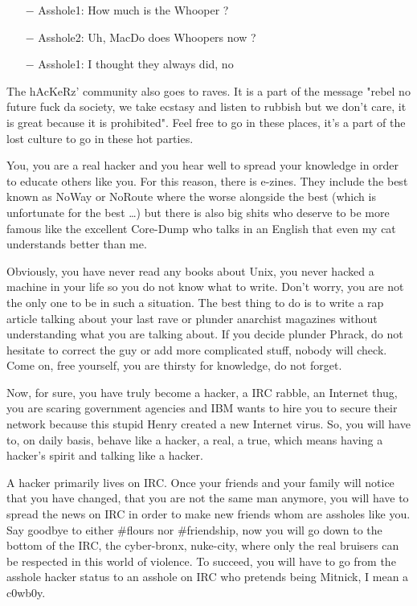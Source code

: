 \begin{itemize}
	\item[$-$] Asshole1: How much is the Whooper ?
	\item[$-$] Asshole2: Uh, MacDo does Whoopers now ?
	\item[$-$] Asshole1: I thought they always did, no 
\end{itemize}

The hAcKeRz' community also goes to raves. It is a part of the message "rebel no future fuck da society, we take ecstasy and listen to rubbish but we don't care, it is great because it is prohibited". Feel free to go in these places, it's a part of the lost culture to go in these hot parties.

You, you are a real hacker and you hear well to spread your knowledge in order to educate others like you. For this reason, there is e-zines. They include the best known as NoWay or NoRoute where the worse alongside the best (which is unfortunate for the best …) but there is also big shits who deserve to be more famous like the excellent Core-Dump who talks in an English that even my cat understands better than me.

Obviously, you have never read any books about Unix, you never hacked a machine in your life so you do not know what to write. Don't worry, you are not the only one to be in such a situation. The best thing to do is to write a rap article talking about your last rave or plunder anarchist magazines without understanding what you are talking about. If you decide plunder Phrack, do not hesitate to correct the guy or add more complicated stuff, nobody will check. Come on, free yourself, you are thirsty for knowledge, do not forget.

Now, for sure, you have truly become a hacker, a IRC rabble, an Internet thug, you are scaring government agencies and IBM wants to hire you to secure their network because this stupid Henry created a new Internet virus. So, you will have to, on daily basis, behave like a hacker, a real, a true, which means having a hacker's spirit and talking like a hacker.

A hacker primarily lives on IRC. Once your friends and your family will notice that you have changed, that you are not the same man anymore, you will have to spread the news on IRC in order to make new friends whom are assholes like you. Say goodbye to either \#flours nor \#friendship, now you will go down to the bottom of the IRC, the cyber-bronx, nuke-city, where only the real bruisers can be respected in this world of violence. To succeed, you will have to go from the asshole hacker status to an asshole on IRC who pretends being Mitnick, I mean a c0wb0y.
\begin{center}\underline{\hspace{5 cm}}\end{center}	

